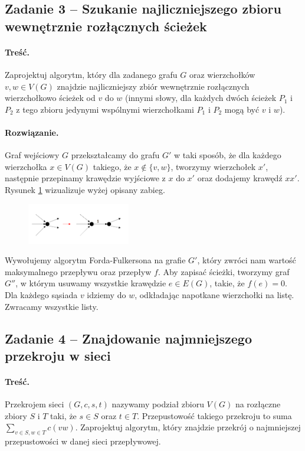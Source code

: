 \subsection{Zadanie 3 -- Szukanie najliczniejszego zbioru wewnętrznie rozłącznych
	ścieżek}
\paragraph{Treść.} Zaprojektuj algorytm, który dla zadanego grafu $G$
oraz wierzchołków $v, w \in V(G)$ znajdzie najliczniejszy
zbiór wewnętrznie rozłącznych wierzchołkowo ścieżek od 
$v$ do $w$ (innymi słowy, dla każdych dwóch ścieżek $P_1$ i $P_2$ z
tego zbioru jedynymi wspólnymi wierzchołkami $P_1$ i $P_2$ 
mogą być $v$ i $w$).

\paragraph{Rozwiązanie.}
Graf wejściowy $G$ przekształcamy do grafu $G'$ w taki sposób, że
dla każdego wierzchołka $x \in V(G)$ takiego, że $x \not \in \{v, w\}$,
tworzymy wierzchołek $x'$, 
następnie przepinamy krawędzie wyjściowe z $x$ do $x'$ oraz 
dodajemy krawędź $xx'$. Rysunek \ref{fig:zad43_fig} wizualizuje
wyżej opisany zabieg.

\begin{figure}[H]
	\centering
	\includegraphics[width=0.4\textwidth]{data/zad43.png}
	\caption{  }
	\label{fig:zad43_fig}
\end{figure}

Wywołujemy algorytm Forda-Fulkersona na grafie $G'$, który zwróci nam 
wartość maksymalnego przepływu oraz przepływ $f$. Aby zapisać ścieżki,
tworzymy graf $G''$, w którym usuwamy wszystkie krawędzie $e \in E(G)$,
takie, że $f(e) = 0$. Dla każdego sąsiada $v$ idziemy do $w$, odkładając
napotkane wierzchołki na listę. Zwracamy wszystkie listy. 

\subsection{Zadanie 4 -- Znajdowanie najmniejszego przekroju w sieci}
\paragraph{Treść.} Przekrojem sieci $(G, c, s, t)$ 
nazywamy podział zbioru $V(G)$ na 
rozłączne zbiory $S$ i $T$ taki, że $s \in S$
oraz $t \in T$. Przepustowość takiego przekroju to suma
$\sum_{v\in S,w\in T} c(vw)$.
Zaprojektuj algorytm, który znajdzie przekrój 
o najmniejszej przepustowości w danej sieci przepływowej.

